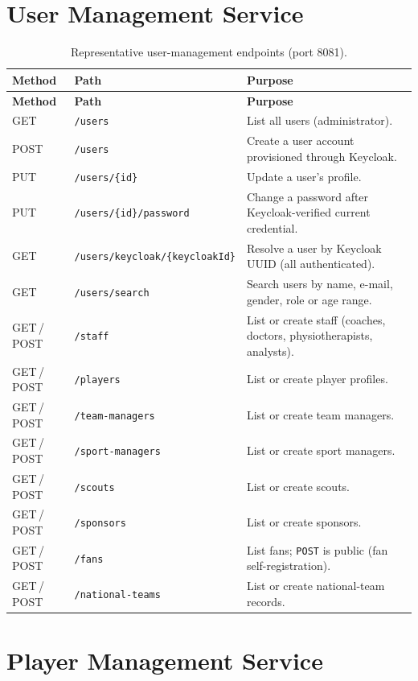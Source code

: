 \section{User Management Service}
\label{app:api-user}

\begin{longtable}{p{} p{} p{}}
\caption{Representative user-management endpoints (port 8081).}
\label{tab:api-user}\\
\toprule
\textbf{Method} & \textbf{Path} & \textbf{Purpose} \\
\midrule
\endfirsthead
\toprule
\textbf{Method} & \textbf{Path} & \textbf{Purpose} \\
\midrule
\endhead
\bottomrule
\endlastfoot
GET    & \texttt{/users} & List all users (administrator). \\
POST   & \texttt{/users} & Create a user account provisioned through Keycloak. \\
PUT    & \texttt{/users/\{id\}} & Update a user's profile. \\
PUT    & \texttt{/users/\{id\}/password} & Change a password after Keycloak-verified current credential. \\
GET    & \texttt{/users/keycloak/\{keycloakId\}} & Resolve a user by Keycloak UUID (all authenticated). \\
GET    & \texttt{/users/search} & Search users by name, e-mail, gender, role or age range. \\
GET\,/\,POST & \texttt{/staff} & List or create staff (coaches, doctors, physiotherapists, analysts). \\
GET\,/\,POST & \texttt{/players} & List or create player profiles. \\
GET\,/\,POST & \texttt{/team-managers} & List or create team managers. \\
GET\,/\,POST & \texttt{/sport-managers} & List or create sport managers. \\
GET\,/\,POST & \texttt{/scouts} & List or create scouts. \\
GET\,/\,POST & \texttt{/sponsors} & List or create sponsors. \\
GET\,/\,POST & \texttt{/fans} & List fans; \texttt{POST} is public (fan self-registration). \\
GET\,/\,POST & \texttt{/national-teams} & List or create national-team records. \\
\end{longtable}

\section{Player Management Service}
\label{app:api-player}

